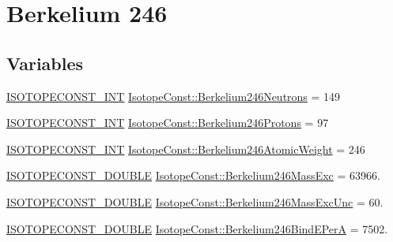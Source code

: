\hypertarget{group___isotope_const-_berkelium-_bk246}{}\section{Berkelium 246}
\label{group___isotope_const-_berkelium-_bk246}
\subsection*{Variables}
\begin{DoxyCompactItemize}
\item 
\mbox{\hyperlink{group___isotope_const-_macros_ga5f18360b3e99483a35c32d789e62621c}{I\+S\+O\+T\+O\+P\+E\+C\+O\+N\+S\+T\+\_\+\+I\+NT}} \mbox{\hyperlink{group___isotope_const-_berkelium-_bk246_ga1e301c1d7d131420f6265bfc80475f3c}{Isotope\+Const\+::\+Berkelium246\+Neutrons}} = 149
\item 
\mbox{\hyperlink{group___isotope_const-_macros_ga5f18360b3e99483a35c32d789e62621c}{I\+S\+O\+T\+O\+P\+E\+C\+O\+N\+S\+T\+\_\+\+I\+NT}} \mbox{\hyperlink{group___isotope_const-_berkelium-_bk246_gab6e96f865e4dc1a854e5a3336700a915}{Isotope\+Const\+::\+Berkelium246\+Protons}} = 97
\item 
\mbox{\hyperlink{group___isotope_const-_macros_ga5f18360b3e99483a35c32d789e62621c}{I\+S\+O\+T\+O\+P\+E\+C\+O\+N\+S\+T\+\_\+\+I\+NT}} \mbox{\hyperlink{group___isotope_const-_berkelium-_bk246_gaaec9c79961fe6c6e88e6c942553767a0}{Isotope\+Const\+::\+Berkelium246\+Atomic\+Weight}} = 246
\item 
\mbox{\hyperlink{group___isotope_const-_macros_ga8f45a7272ce02c0b4c65c44636ed719a}{I\+S\+O\+T\+O\+P\+E\+C\+O\+N\+S\+T\+\_\+\+D\+O\+U\+B\+LE}} \mbox{\hyperlink{group___isotope_const-_berkelium-_bk246_gadbef18b4059ddcf4e16de07fdeec7bd0}{Isotope\+Const\+::\+Berkelium246\+Mass\+Exc}} = 63966.
\item 
\mbox{\hyperlink{group___isotope_const-_macros_ga8f45a7272ce02c0b4c65c44636ed719a}{I\+S\+O\+T\+O\+P\+E\+C\+O\+N\+S\+T\+\_\+\+D\+O\+U\+B\+LE}} \mbox{\hyperlink{group___isotope_const-_berkelium-_bk246_ga8255a38dc48f062b2527ccc2745fe96d}{Isotope\+Const\+::\+Berkelium246\+Mass\+Exc\+Unc}} = 60.
\item 
\mbox{\hyperlink{group___isotope_const-_macros_ga8f45a7272ce02c0b4c65c44636ed719a}{I\+S\+O\+T\+O\+P\+E\+C\+O\+N\+S\+T\+\_\+\+D\+O\+U\+B\+LE}} \mbox{\hyperlink{group___isotope_const-_berkelium-_bk246_ga03bef09bbbacf3e70954688f3992c728}{Isotope\+Const\+::\+Berkelium246\+Bind\+E\+PerA}} = 7502.
\item 

\end{DoxyCompactItemize}
